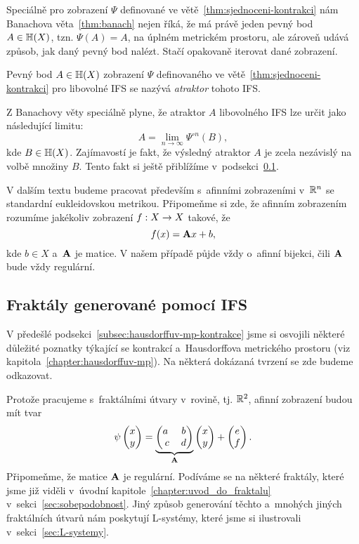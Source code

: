 Speciálně pro zobrazení $\Psi$ definované ve větě~\ref{thm:sjednoceni-kontrakci} nám Banachova věta~\ref{thm:banach} nejen říká, že má právě jeden pevný bod $A\in\mathbb{H}(X)$, tzn. $\Psi(A)=A$, na úplném metrickém prostoru, ale zároveň udává způsob, jak daný pevný bod nalézt. Stačí opakovaně iterovat dané zobrazení.
\begin{definition}[Atraktor]\label{def:atraktor}
    Pevný bod $A\in\mathbb{H}(X)$ zobrazení $\Psi$ definovaného ve větě~\ref{thm:sjednoceni-kontrakci} pro libovolné IFS se nazývá \emph{atraktor} tohoto IFS.
\end{definition}
Z Banachovy věty speciálně plyne, že atraktor $A$ libovolného IFS lze určit jako následující limitu:
\[A=\lim_{n\to\infty}\Psi^{\circ n}(B),\]
kde $B\in\mathbb{H}(X)$. Zajímavostí je fakt, že výsledný atraktor $A$ je zcela nezávislý na volbě množiny $B$. Tento fakt si ještě přiblížíme v~podsekci~\ref{subsec:fraktaly-ifs}.

V dalším textu budeme pracovat především s~afinními zobrazeními v~$\mathbb{R}^n$ se standardní eukleidovskou metrikou. Připomeňme si zde, že afinním zobrazením rozumíme jakékoliv zobrazení $f:X \rightarrow X$ takové, že
\[f(x)=\mathbf{A}x+b,\]
kde $b\in X$ a~$\mathbf{A}$ je matice. V našem případě půjde vždy o~afinní bijekci, čili $\mathbf{A}$ bude vždy regulární.

\subsection{Fraktály generované pomocí IFS}\label{subsec:fraktaly-ifs}

V předešlé podsekci~\ref{subsec:hausdorffuv-mp-kontrakce} jsme si osvojili některé důležité poznatky týkající se kontrakcí a~Hausdorffova metrického prostoru (viz kapitola~\ref{chapter:hausdorffuv-mp}). Na některá dokázaná tvrzení se zde budeme odkazovat.

Protože pracujeme s~fraktálními útvary v~rovině, tj. $\mathbb{R}^2$, afinní zobrazení budou mít tvar
\begin{equation}\label{eq:afinita-v-R2}
    \psi\left(\begin{matrix}
        x\\
        y
    \end{matrix}\right)=\underbrace{\left(\begin{matrix}
        a~& b\\
        c & d
    \end{matrix}\right)}_{\mathbf{A}}\left(\begin{matrix}
        x\\
        y
    \end{matrix}\right)+\left(\begin{matrix}
        e\\
        f
    \end{matrix}\right).
\end{equation}
Připomeňme, že matice $\mathbf{A}$ je regulární. Podíváme se na některé fraktály, které jsme již viděli v~úvodní kapitole~\ref{chapter:uvod_do_fraktalu} v~sekci~\ref{sec:sobepodobnost}. Jiný způsob generování těchto a~mnohých jiných fraktálních útvarů nám poskytují L-systémy, které jsme si ilustrovali v~sekci~\ref{sec:L-systemy}.

